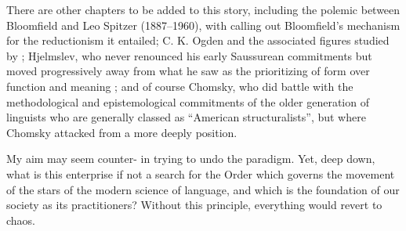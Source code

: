 \documentclass[output=paper]{langscibook}
\begin{document}
There are other chapters to be added to this story, including the polemic between Bloomfield and Leo Spitzer (1887--1960), with \citet{Spitzer1944} calling out Bloomfield's mechanism for the reductionism it entailed; C. K. Ogden and the associated figures studied by \citet{McElvenny2018}; Hjelmslev, who never renounced his early Saussurean commitments but moved progressively away from what he saw as the prioritizing of form over function and meaning \citep{Joseph2018hj}; and of course Chomsky, who did battle with the methodological and epistemological commitments of the older generation of linguists who are generally classed as ``American structuralists'', but where Chomsky attacked from a more deeply  position.

My aim may seem counter- in trying to undo the paradigm. Yet, deep down, what is this enterprise if not a search for the Order which governs the movement of the stars of the modern science of language, and which is the foundation of our society as its practitioners? Without this principle, everything would revert to chaos.

\sloppy
\printbibliography[heading=subbibliography,notkeyword=this]
\end{document}
